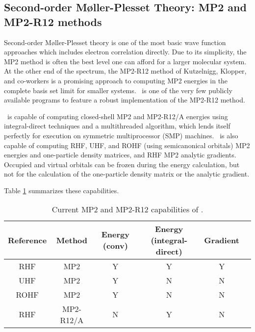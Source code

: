 \subsection{Second-order M\o ller-Plesset Theory: MP2 and MP2-R12 methods} \label{mp2}

Second-order M\o ller-Plesset theory is one of the most basic wave
function approaches which includes electron correlation
directly.
Due to its simplicity, the MP2 method is often the best
level one can afford for a larger molecular system.
At the other end of the spectrum, the MP2-R12 method
of Kutzelnigg, Klopper, and co-workers is a promising
approach to computing MP2 energies in the complete
basis set limit for smaller systems. \PSIthree\ is
one of the very few publicly available programs to
feature a robust implementation of the MP2-R12 method.

\PSIthree\ is capable of computing closed-shell
MP2 and MP2-R12/A energies using integral-direct techniques and a
multithreaded algorithm, which lends itself perfectly for execution 
on symmetric multiprocessor (SMP) machines. \PSIthree\ is also
capable of computing RHF, UHF, and ROHF (using semicanonical orbitals)
MP2 energies and one-particle density matrices, and RHF MP2 analytic 
gradients.  Occupied and virtual orbitals can be frozen during the 
energy calculation, but not for the calculation of the 
one-particle density matrix or the analytic gradient.

Table \ref{table:mp2summary} summarizes these capabilities.
\begin{table}[h]
\begin{center}
\begin{tabular}{cccccc}
\hline
\hline
Reference & Method    & Energy (conv) & Energy (integral-direct) & Gradient  \\
\hline
RHF       & MP2       & Y             & Y                        & Y \\
UHF       & MP2       & Y             & N                        & N \\
ROHF      & MP2       & Y             & N                        & N \\
RHF       & MP2-R12/A & N             & Y                        & N \\
\hline
\hline
\end{tabular}
\end{center}
\caption{Current MP2 and MP2-R12 capabilities of \PSIthree.}
\label{table:mp2summary}
\end{table}


